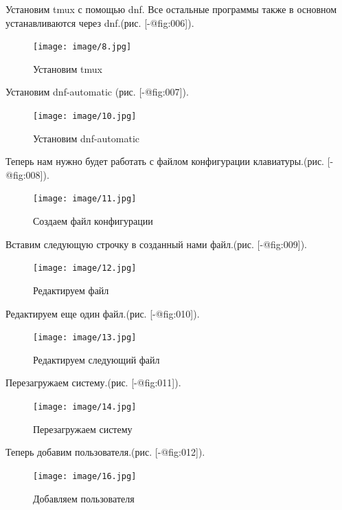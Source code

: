 Установим tmux с помощью dnf. Все остальные программы также в основном
устанавливаются через dnf.(рис. {[}-@fig:006{]}).

\begin{figure}
\hypertarget{fig:006}{%
\centering
\texttt{[image: image/8.jpg]}
\caption{Установим tmux}\label{fig:006}
}
\end{figure}

Установим dnf-automatic (рис. {[}-@fig:007{]}).

\begin{figure}
\hypertarget{fig:007}{%
\centering
\texttt{[image: image/10.jpg]}
\caption{Установим dnf-automatic}\label{fig:007}
}
\end{figure}

Теперь нам нужно будет работать с файлом конфигурации клавиатуры.(рис.
{[}-@fig:008{]}).

\begin{figure}
\hypertarget{fig:008}{%
\centering
\texttt{[image: image/11.jpg]}
\caption{Создаем файл конфигурации}\label{fig:008}
}
\end{figure}

Вставим следующую строчку в созданный нами файл.(рис. {[}-@fig:009{]}).

\begin{figure}
\hypertarget{fig:009}{%
\centering
\texttt{[image: image/12.jpg]}
\caption{Редактируем файл}\label{fig:009}
}
\end{figure}

Редактируем еще один файл.(рис. {[}-@fig:010{]}).

\begin{figure}
\hypertarget{fig:010}{%
\centering
\texttt{[image: image/13.jpg]}
\caption{Редактируем следующий файл}\label{fig:010}
}
\end{figure}

Перезагружаем систему.(рис. {[}-@fig:011{]}).

\begin{figure}
\hypertarget{fig:011}{%
\centering
\texttt{[image: image/14.jpg]}
\caption{Перезагружаем систему}\label{fig:011}
}
\end{figure}

Теперь добавим пользователя.(рис. {[}-@fig:012{]}).

\begin{figure}
\hypertarget{fig:012}{%
\centering
\texttt{[image: image/16.jpg]}
\caption{Добавляем пользователя}\label{fig:012}
}
\end{figure}


